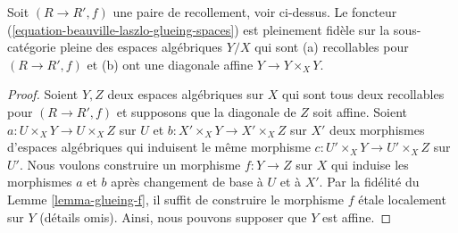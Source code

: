 \begin{lemma}
\label{lemma-glueing-ff}
Soit $(R \to R', f)$ une paire de recollement, voir ci-dessus.
Le foncteur (\ref{equation-beauville-laszlo-glueing-spaces})
est pleinement fidèle sur la sous-catégorie pleine des
espaces algébriques $Y/X$ qui sont (a) recollables pour $(R \to R', f)$
et (b) ont une diagonale affine $Y \to Y \times_X Y$.
\end{lemma}

\begin{proof}
Soient $Y, Z$ deux espaces algébriques sur $X$ qui sont tous deux recollables pour
$(R \to R', f)$ et supposons que la diagonale de $Z$ soit affine. Soient
$a : U \times_X Y \to U \times_X Z$ sur $U$ et
$b : X' \times_X Y \to X' \times_X Z$ sur $X'$ deux morphismes
d'espaces algébriques
qui induisent le même morphisme $c : U' \times_X Y \to U' \times_X Z$
sur $U'$.
Nous voulons construire un morphisme $f : Y \to Z$ sur $X$
qui induise les morphismes $a$ et $b$ après changement de base à $U$ et à $X'$.
Par la fidélité du Lemme \ref{lemma-glueing-f}, il suffit de construire
le morphisme $f$ \'etale localement sur $Y$ (détails omis).
Ainsi, nous pouvons supposer que $Y$ est affine.


\end{proof}

